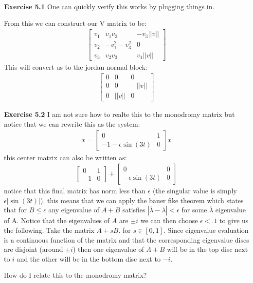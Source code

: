 \documentclass[12pt]{article}
\newenvironment{exercise}[1]{\vspace{.1in}\noindent\textbf{Exercise #1 \hspace{.05em}}}{}
\theoremstyle{definition}
\theoremstyle{remark}
\begin{document}
\begin{exercise}{5.1}
	One can quickly verify this works by plugging things in.

	From this we can construct our V matrix to be:
	\begin{align}
		\begin{bmatrix}
			v_1 & v_1v_2       & -v_3||v|| \\
			v_2 & -v_1^2-v_3^2 & 0         \\
			v_3 & v_2v_3       & v_1||v||
		\end{bmatrix}
	\end{align}
	This will convert us to the jordan normal block:
	\begin{align}
		\begin{bmatrix}
			0 & 0     & 0      \\
			0 & 0     & -||v|| \\
			0 & ||v|| & 0
		\end{bmatrix}
	\end{align}
\end{exercise}

\begin{exercise}{5.2}
	I am not sure how to realte this to the monodromy matrix but notice that we can rewrite this as the system:
	\begin{align}
		x=%
		\begin{bmatrix}
			0                    & 1 \\
			-1-\epsilon \sin(3t) & 0
		\end{bmatrix}x
	\end{align}
	this center matrix can also be written as:
	\begin{align}
		\begin{bmatrix}
			0  & 1 \\
			-1 & 0
		\end{bmatrix}+%
		\begin{bmatrix}
			0                  & 0 \\
			-\epsilon \sin(3t) & 0
		\end{bmatrix}
	\end{align}
	notice that this final matrix has norm less than $\epsilon$ (the singular value is simply $\epsilon |\sin(3t)|$). this means that we can apply the bauer fike theorem which states that for $B\leq \epsilon$ any eigenvalue of $A+B$ satisfies $|\overline \lambda-\lambda|<\epsilon$ for some $\overline \lambda$ eigenvalue of A. Notice that the eigenvalues of $A$ are $\pm i$ we can then choose $\epsilon < .1$ to give us the following. Take the matrix $A+sB$. for $s\in [0,1]$. Since eigenvalue evaluation is a continuous function of the matrix and that the corresponding eigenvalue discs are disjoint (around $\pm i$) then one eigenvalue of $A+B$ will be in the top disc next to $i$ and the other will be in the bottom disc next to $-i$.

	How do I relate this to the monodromy matrix?
\end{exercise}
\end{document}
